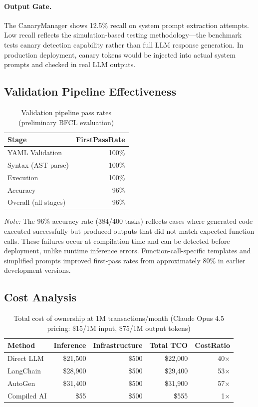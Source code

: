 \documentclass[11pt]{article}
\begin{document}
\paragraph{Output Gate.} The CanaryManager shows 12.5\% recall on system prompt extraction attempts. Low recall reflects the simulation-based testing methodology---the benchmark tests canary detection capability rather than full LLM response generation. In production deployment, canary tokens would be injected into actual system prompts and checked in real LLM outputs.

\subsection{Validation Pipeline Effectiveness}

\begin{table}[ht]
\centering
\caption{Validation pipeline pass rates (preliminary BFCL evaluation)}
\label{tab:validation-results}
\begin{tabular}{lr}
\toprule
Stage & FirstPassRate \\
\midrule
YAML Validation & 100\% \\
Syntax (AST parse) & 100\% \\
Execution & 100\% \\
Accuracy & 96\% \\
\midrule
Overall (all stages) & 96\% \\
\bottomrule
\end{tabular}
\end{table}

\noindent\textit{Note:} The 96\% accuracy rate (384/400 tasks) reflects cases where generated code executed successfully but produced outputs that did not match expected function calls. These failures occur at compilation time and can be detected before deployment, unlike runtime inference errors. Function-call-specific templates and simplified prompts improved first-pass rates from approximately 80\% in earlier development versions.

\subsection{Cost Analysis}

\begin{table}[ht]
\centering
\caption{Total cost of ownership at 1M transactions/month (Claude Opus 4.5 pricing: \$15/1M input, \$75/1M output tokens)}
\label{tab:cost-results}
\begin{tabular}{lrrrr}
\toprule
Method & Inference & Infrastructure & Total TCO & CostRatio \\
\midrule
Direct LLM & \$21,500 & \$500 & \$22,000 & 40$\times$ \\
LangChain & \$28,900 & \$500 & \$29,400 & 53$\times$ \\
AutoGen & \$31,400 & \$500 & \$31,900 & 57$\times$ \\
Compiled AI & \$55 & \$500 & \$555 & 1$\times$ \\
\bottomrule
\end{tabular}
\end{table}
\end{document}
